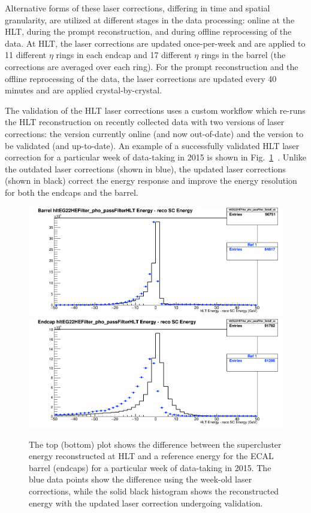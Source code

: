 Alternative forms of these laser corrections, differing in time and
spatial granularity, are utilized at different
stages in the data processing: online at the HLT, during the prompt
reconstruction, and during offline reprocessing of the data. At HLT,
the laser corrections are updated once-per-week and are applied to 11
different $\eta$ rings in each endcap and 17 different $\eta$ rings in
the barrel (the corrections are averaged over each ring). For the prompt reconstruction and the offline
reprocessing of the data, the laser corrections are updated every 40 minutes
and are applied crystal-by-crystal.

The validation of the HLT laser corrections uses a custom workflow which
re-runs the HLT reconstruction on recently collected data with two versions of
laser corrections: the version currently online (and now out-of-date)
and the version to be validated (and up-to-date). An example of a
successfully validated HLT laser correction for a particular week of
data-taking in 2015 is shown in Fig.~\ref{fig:ECALHLT}~\cite{ECALAlCaTwiki}. Unlike the
outdated laser corrections (shown in blue), the updated
laser corrections (shown in black) correct the energy response and
improve the energy resolution for both the endcaps and the barrel.

\begin{figure}\centering
\includegraphics[width=.9\textwidth]{figs/cms/Week42_transpCorr_EB_overlay_IntermediateBlack_oldBlue.png}\\
\includegraphics[width=.9\textwidth]{figs/cms/Week41_transpCorr_EE_overlay_newBlack_oldBlue.png}
\caption{The top (bottom) plot shows the difference between the supercluster energy
  reconstructed at HLT and a reference energy for the ECAL barrel (endcaps) for a particular
  week of data-taking in 2015. The blue data points show the
  difference using the week-old laser corrections, while the solid black histogram shows the reconstructed energy with the
  updated laser correction undergoing validation.\label{fig:ECALHLT}}
\end{figure}

